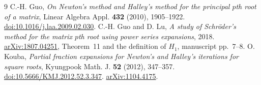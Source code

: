 \documentclass[11pt]{article}
\begin{document}
\begin{thebibliography}{9}
C.-H. Guo, \emph{On Newton's method and Halley's method for the principal $p$th root of a matrix}, Linear Algebra Appl. \textbf{432} (2010), 1905--1922.
\href{https://doi.org/10.1016/j.laa.2009.02.030}{doi:10.1016/j.laa.2009.02.030}.
C.-H. Guo and D. Lu, \emph{A study of Schr\"oder's method for the matrix $p$th root using power series expansions}, 2018.
\href{https://arxiv.org/abs/1807.04251}{arXiv:1807.04251}, Theorem~11 and the definition of $H_1$, manuscript pp.~7--8.
O. Kouba, \emph{Partial fraction expansions for Newton's and Halley's iterations for square roots}, Kyungpook Math. J. \textbf{52} (2012), 347--357.
\href{https://doi.org/10.5666/KMJ.2012.52.3.347}{doi:10.5666/KMJ.2012.52.3.347}.
\href{https://arxiv.org/abs/1104.4175}{arXiv:1104.4175}.
\end{thebibliography}
\end{document}
